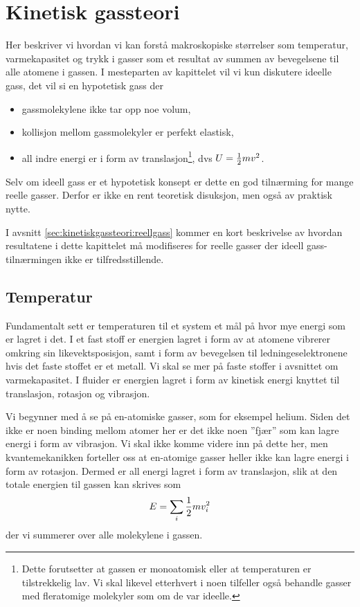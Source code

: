 \chapter{Kinetisk gassteori}
Her beskriver vi hvordan vi kan forstå makroskopiske størrelser som temperatur, varmekapasitet og trykk i gasser som et resultat av summen av bevegelsene til alle atomene i gassen. I mesteparten av kapittelet vil vi kun diskutere ideelle gass, det vil si en hypotetisk gass der
\begin{itemize}
	\item
	gassmolekylene ikke tar opp noe volum,
	\item
	kollisjon mellom gassmolekyler er perfekt elastisk,
	\item
	all indre energi er i form av translasjon\footnote{Dette forutsetter at gassen er  monoatomisk eller at temperaturen er tilstrekkelig lav. Vi skal likevel etterhvert i noen tilfeller også behandle gasser med fleratomige molekyler som om de var ideelle.}, dvs $U = \frac{1}{2} mv^2$.
\end{itemize}
Selv om ideell gass er et hypotetisk konsept er dette en god tilnærming for mange reelle gasser. Derfor er ikke en rent teoretisk disuksjon, men også av praktisk nytte.

I avsnitt \ref{sec:kinetiskgassteori:reellgass} kommer en kort beskrivelse av hvordan resultatene i dette kapittelet må modifiseres for reelle gasser der ideell gass-tilnærmingen ikke er tilfredsstillende.

\section{Temperatur}
\label{sec:kinetiskgassteori:temperatur}
Fundamentalt sett er temperaturen til et system et mål på hvor mye energi som er lagret i det. I et fast stoff er energien lagret i form av at atomene vibrerer omkring sin likevektsposisjon, samt i form av bevegelsen til ledningeselektronene hvis det faste stoffet er et metall. Vi skal se mer på faste stoffer i avsnittet om varmekapasitet. I fluider er energien lagret i form av kinetisk energi knyttet til translasjon, rotasjon og vibrasjon. 

Vi begynner med å se på en-atomiske gasser, som for eksempel helium. Siden det ikke er noen binding mellom atomer her er det ikke noen 
''fjær'' som kan lagre energi i form av vibrasjon. Vi skal ikke komme videre inn på dette her, men kvantemekanikken forteller oss at en-atomige gasser heller ikke kan lagre energi i form av rotasjon. Dermed er all energi lagret i form av translasjon, slik at den totale energien til gassen kan skrives som
\begin{displaymath}
	E = \sum_i \frac{1}{2} mv_i^2
\end{displaymath}
der vi summerer over alle molekylene i gassen.

